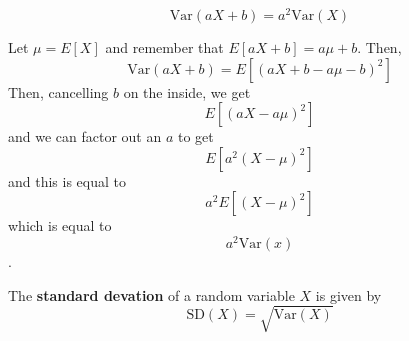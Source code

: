 \documentclass{article}
\begin{document}
\begin{proposition}
$$\text{Var}(aX + b) = a^2\text{Var}(X)$$
\end{proposition}

\begin{customproof}
Let $\mu = E[X]$ and remember that $E[aX+b] = a\mu + b$. Then, $$\text{Var}(aX+b) = E[(aX+b-a\mu - b)^2]$$Then, cancelling $b$ on the inside, we get$$E[(aX-a\mu)^2]$$and we can factor out an $a$ to get$$E[a^2(X-\mu)^2]$$and this is equal to $$a^2E[(X-\mu)^2]$$which is equal to$$a^2\text{Var}(x)$$.
\end{customproof}

\begin{definition}
The \textbf{standard devation} of a random variable $X$ is given by $$\text{SD}(X) = \sqrt{\text{Var}(X)}$$ 
\end{definition}
\end{document}

